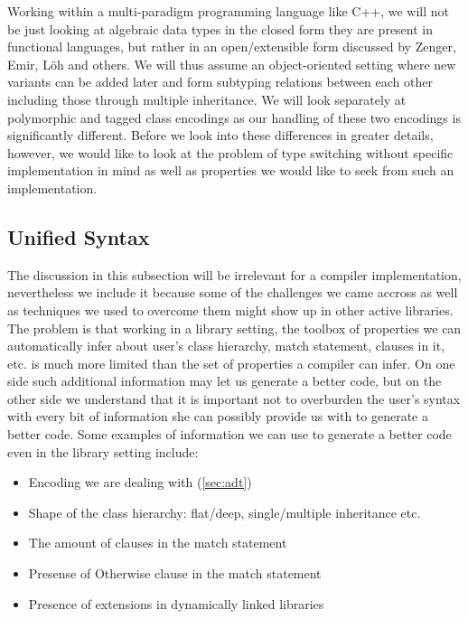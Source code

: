 \documentclass[preprint]{sigplanconf}
\begin{document}
Working within a multi-paradigm programming language like C++, we will not be 
just looking at algebraic data types in the closed form they are present in 
functional languages, but rather in an open/extensible form discussed by 
Zenger\cite{Zenger:2001}, Emir\cite{EmirThesis}, L\"oh\cite{LohHinze2006} and others. We will thus 
assume an object-oriented setting where new variants can be added later and form
subtyping relations between each other including those through multiple 
inheritance. We will look separately at polymorphic and tagged class encodings 
as our handling of these two encodings is significantly different. Before we 
look into these differences in greater details, however, we would like to look 
at the problem of type switching without specific implementation in mind as well 
as properties we would like to seek from such an implementation.

\subsection{Unified Syntax}
\label{sec:unisyn}

The discussion in this subsection will be irrelevant for a compiler 
implementation, nevertheless we include it because some of the challenges we 
came accross as well as techniques we used to overcome them might show up in 
other active libraries. The problem is that working in a library setting, the 
toolbox of properties we can automatically infer about user's class hierarchy, 
match statement, clauses in it, etc. is much more limited than the set of 
properties a compiler can infer. On one side such additional information may let 
us generate a better code, but on the other side we understand that it is 
important not to overburden the user's syntax with every bit of information she 
can possibly provide us with to generate a better code. Some examples of 
information we can use to generate a better code even in the library setting 
include:

\begin{itemize}
\item Encoding we are dealing with (\textsection\ref{sec:adt})
\item Shape of the class hierarchy: flat/deep, single/multiple inheritance etc.
\item The amount of clauses in the match statement
\item Presense of Otherwise clause in the match statement
\item Presence of extensions in dynamically linked libraries
\end{itemize}
\end{document}
